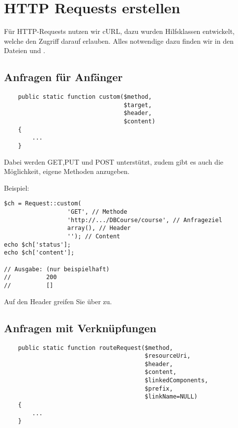 \section{HTTP Requests erstellen}
Für HTTP-Requests nutzen wir cURL, dazu wurden Hilfsklassen entwickelt, welche den Zugriff darauf erlauben. Alles notwendige dazu finden wir in den Dateien  und .

\subsection{Anfragen für Anfänger}
\begin{minipage}{\textwidth}
\begin{lstlisting}
    public static function custom($method, 
                                  $target, 
                                  $header,  
                                  $content)
    {
        ...
    }
\end{lstlisting}
\end{minipage}

Dabei werden GET,PUT und POST unterstützt, zudem gibt es auch die Möglichkeit, eigene Methoden anzugeben.

\begin{minipage}{\textwidth}
Beispiel:
\begin{lstlisting}
$ch = Request::custom(
                  'GET', // Methode
                  'http://.../DBCourse/course', // Anfrageziel
                  array(), // Header
                  ''); // Content
echo $ch['status'];
echo $ch['content']; 
                     
// Ausgabe: (nur beispielhaft)
//          200
//          []         
\end{lstlisting}
\end{minipage}
Auf den Header greifen Sie über  zu.

\subsection{Anfragen mit Verknüpfungen}
\begin{minipage}{\textwidth}
\begin{lstlisting}
    public static function routeRequest($method, 
                                        $resourceUri, 
                                        $header,  
                                        $content,
                                        $linkedComponents,
                                        $prefix,
                                        $linkName=NULL)
    {
        ...
    }
\end{lstlisting}
\end{minipage}


